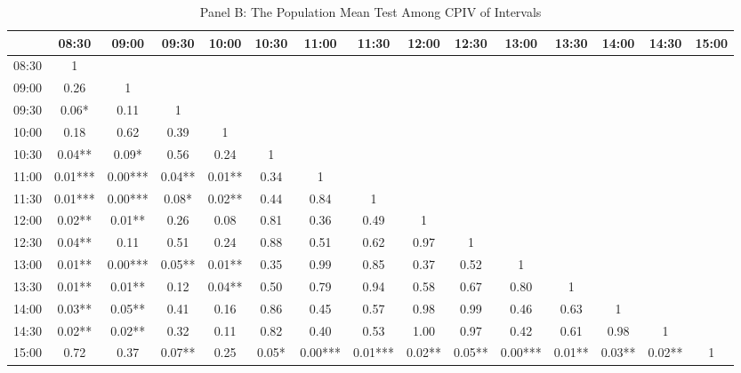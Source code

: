 \begin{table}[h]
\begin{threeparttable}
\medskip

\begin{subtable}[t]{\linewidth}

\caption{Panel B: The Population Mean Test Among CPIV of Intervals}
\footnotesize

\begin{tabular}{|c|cccccccccccccc}
\toprule

      & 08:30   & 09:00   & 09:30  & 10:00  & 10:30 & 11:00   & 11:30   & 12:00  & 12:30  & 13:00   & 13:30  & 14:00  & 14:30  & 15:00 \\ \midrule
08:30 & 1       &         &        &        &       &         &         &        &        &         &        &        &        &       \\
09:00 & 0.26    & 1       &        &        &       &         &         &        &        &         &        &        &        &       \\
09:30 & 0.06*   & 0.11    & 1      &        &       &         &         &        &        &         &        &        &        &       \\
10:00 & 0.18    & 0.62    & 0.39   & 1      &       &         &         &        &        &         &        &        &        &       \\
10:30 & 0.04**  & 0.09*   & 0.56   & 0.24   & 1     &         &         &        &        &         &        &        &        &       \\
11:00 & 0.01*** & 0.00*** & 0.04** & 0.01** & 0.34  & 1       &         &        &        &         &        &        &        &       \\
11:30 & 0.01*** & 0.00*** & 0.08*  & 0.02** & 0.44  & 0.84    & 1       &        &        &         &        &        &        &       \\
12:00 & 0.02**  & 0.01**  & 0.26   & 0.08   & 0.81  & 0.36    & 0.49    & 1      &        &         &        &        &        &       \\
12:30 & 0.04**  & 0.11    & 0.51   & 0.24   & 0.88  & 0.51    & 0.62    & 0.97   & 1      &         &        &        &        &       \\
13:00 & 0.01**  & 0.00*** & 0.05** & 0.01** & 0.35  & 0.99    & 0.85    & 0.37   & 0.52   & 1       &        &        &        &       \\
13:30 & 0.01**  & 0.01**  & 0.12   & 0.04** & 0.50  & 0.79    & 0.94    & 0.58   & 0.67   & 0.80    & 1      &        &        &       \\
14:00 & 0.03**  & 0.05**  & 0.41   & 0.16   & 0.86  & 0.45    & 0.57    & 0.98   & 0.99   & 0.46    & 0.63   & 1      &        &       \\
14:30 & 0.02**  & 0.02**  & 0.32   & 0.11   & 0.82  & 0.40    & 0.53    & 1.00   & 0.97   & 0.42    & 0.61   & 0.98   & 1      &       \\
15:00 & 0.72    & 0.37    & 0.07** & 0.25   & 0.05* & 0.00*** & 0.01*** & 0.02** & 0.05** & 0.00*** & 0.01** & 0.03** & 0.02** & 1  \\
\bottomrule


\end{tabular}
\end{subtable}
\end{threeparttable}
\end{table}
